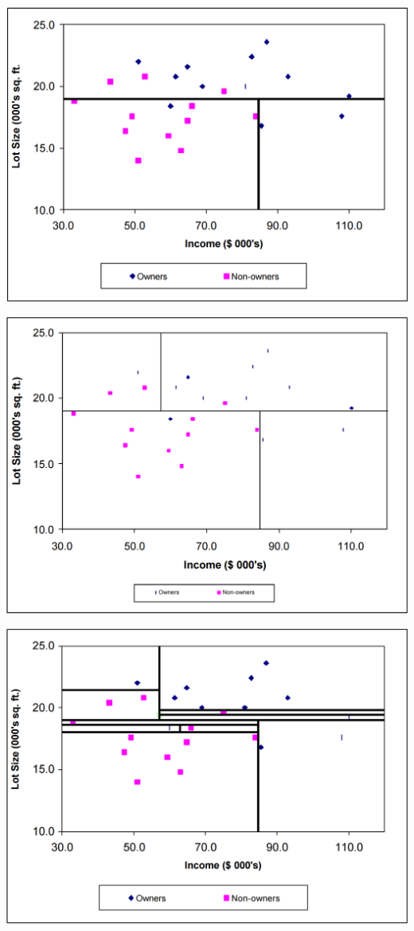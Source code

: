 \documentclass[xcolor=table,aspectratio=169]{beamer}
\begin{document}
\begin{frame}
	\includegraphics[height=\textheight]{pics/tree3.png}
\end{frame}
\begin{frame}
	\includegraphics[height=\textheight]{pics/tree4.png}
\end{frame}
\begin{frame}
	\includegraphics[height=\textheight]{pics/tree5.png}
\end{frame}
\end{document}
